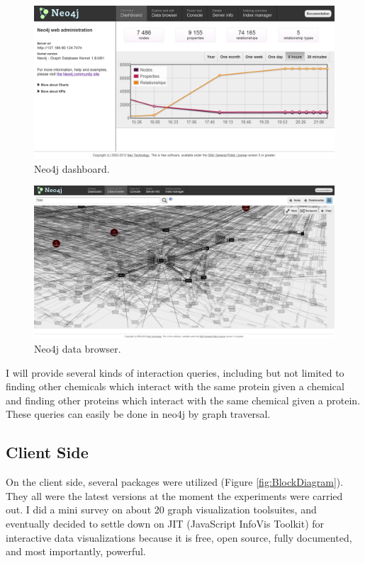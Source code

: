 \documentclass[10pt,conference,compsocconf]{../IEEEtran}
\begin{document}
\begin{figure}
\centering
\includegraphics[width=\linewidth]{Dashboard.png}
\caption{Neo4j dashboard.}
\label{fig:Dashboard}
\end{figure}

\begin{figure}
\centering
\includegraphics[width=\linewidth]{DataBrowser.png}
\caption{Neo4j data browser.}
\label{fig:DataBrowser}
\end{figure}

I will provide several kinds of interaction queries, including but not limited to finding other chemicals which interact with the same protein given a chemical and finding other proteins which interact with the same chemical given a protein. These queries can easily be done in neo4j by graph traversal.

\subsection{Client Side}

On the client side, several packages were utilized (Figure \ref{fig:BlockDiagram}). They all were the latest versions at the moment the experiments were carried out. I did a mini survey on about 20 graph visualization toolsuites, and eventually decided to settle down on JIT (JavaScript InfoVis Toolkit) for interactive data visualizations because it is free, open source, fully documented, and most importantly, powerful.
\end{document}
